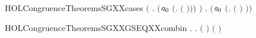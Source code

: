 \begin{SaveVerbatim}{HOLCongruenceTheoremsSGXXcases}
       \ensuremath{(}\HOLSymConst{\HOLTokenExists{}} . \ensuremath{(}\ensuremath{\HOLBoundVar{a}\sb{\mathrm{0}}} \HOLSymConst{\ensuremath{=}} \ensuremath{(}\HOLTokenLambda{}.   \ensuremath{(} \ensuremath{)}\ensuremath{)}\ensuremath{)} \HOLSymConst{\HOLTokenConj{}}  \ensuremath{)} \HOLSymConst{\HOLTokenDisj{}}
       \HOLSymConst{\HOLTokenExists{}} . \ensuremath{(}\ensuremath{\HOLBoundVar{a}\sb{\mathrm{0}}} \HOLSymConst{\ensuremath{=}} \ensuremath{(}\HOLTokenLambda{}.  \ensuremath{(} \ensuremath{)} \ensuremath{)}\ensuremath{)} \HOLSymConst{\HOLTokenConj{}}  
\end{SaveVerbatim}
\newcommand{\HOLCongruenceTheoremsSGXXcases}{\UseVerbatim{HOLCongruenceTheoremsSGXXcases}}
\begin{SaveVerbatim}{HOLCongruenceTheoremsSGXXGSEQXXcombin}
\HOLTokenTurnstile{} \HOLSymConst{\HOLTokenForall{}}.   \HOLSymConst{\HOLTokenConj{}}   \HOLSymConst{\HOLTokenImp{}} \HOLSymConst{\HOLTokenForall{}}.   \HOLSymConst{\HOLTokenImp{}}  \ensuremath{(} \HOLConst{\HOLTokenCompose} \ensuremath{)} \HOLSymConst{\HOLTokenConj{}}  \ensuremath{(} \HOLConst{\HOLTokenCompose} \ensuremath{)}
\end{SaveVerbatim}
\newcommand{\HOLCongruenceTheoremsSGXXGSEQXXcombin}{\UseVerbatim{HOLCongruenceTheoremsSGXXGSEQXXcombin}}
